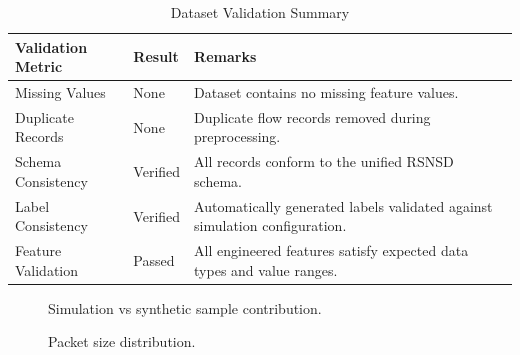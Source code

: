 \documentclass[12pt,a4paper]{report}
\begin{document}
	
	\begin{table}[H]
		\centering
		\caption{Dataset Validation Summary}
		\label{tab:statistics}
		
		\begin{tabular}{|p{5cm}|p{3cm}|p{4cm}|}
			\hline
			
			\textbf{Validation Metric}
			&
			\textbf{Result}
			&
			\textbf{Remarks}
			\\
			\hline
			
			Missing Values &
			None &
			Dataset contains no missing feature values.
			\\
			\hline
			
			Duplicate Records &
			None &
			Duplicate flow records removed during preprocessing.
			\\
			\hline
			
			Schema Consistency &
			Verified &
			All records conform to the unified RSNSD schema.
			\\
			\hline
			
			Label Consistency &
			Verified &
			Automatically generated labels validated against simulation configuration.
			\\
			\hline
			
			Feature Validation &
			Passed &
			All engineered features satisfy expected data types and value ranges.
			\\
			\hline
			
		\end{tabular}
		
	\end{table}
	
	
	\begin{figure}[H]
		\centering
		\fbox{\rule{0pt}{3.2in}\rule{0.9\textwidth}{0pt}}
		\caption{Simulation vs synthetic sample contribution.}
		\label{fig:source_distribution}
	\end{figure}
	
	
	\begin{figure}[H]
		\centering
		\fbox{\rule{0pt}{3.2in}\rule{0.9\textwidth}{0pt}}
		\caption{Packet size distribution.}
		\label{fig:packet_distribution}
	\end{figure}
	
\end{document}
